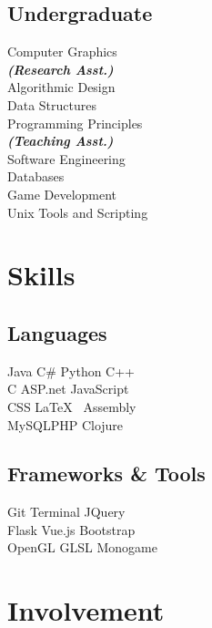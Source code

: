 \documentclass[]{deedy-resume-openfont}
\begin{document}
\begin{minipage}[t]{0.33\textwidth}
\subsection{Undergraduate}
Computer Graphics \\
{\footnotesize \textit{\textbf{(Research Asst.) }}} \\
Algorithmic Design \\ 
Data Structures \\
Programming Principles\\
{\footnotesize \textit{\textbf{(Teaching Asst.) }}} \\
Software Engineering \\
Databases \\
Game Development \\
Unix Tools and Scripting \\
\sectionsep


\section{Skills}
\subsection{Languages}
Java \textbullet{} C\# \textbullet{} Python \textbullet{} C++ \\
C\textbullet{} ASP.net \textbullet{} JavaScript \\ 
CSS \textbullet{} \LaTeX\ \textbullet{} Assembly \\
MySQL\textbullet{}PHP \textbullet{}Clojure\\
\sectionsep
\sectionsep
\subsection{Frameworks \& Tools}
Git \textbullet{}  Terminal \textbullet{} JQuery\\
Flask\textbullet{} Vue.js\textbullet{} Bootstrap \\ 
OpenGL \textbullet{} GLSL \textbullet{} Monogame
\sectionsep


\section{Involvement} 

\end{minipage}
\end{document}

